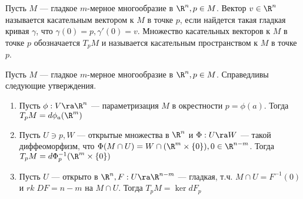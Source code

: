 \begin{definition}
    Пусть \(M\) --- гладкое \(m\)-мерное многообразие в \(\R^n, p \in M\). Вектор \(v \in \R^n\) называется касательным вектором к \(M\) в точке \(p\), если найдется такая гладкая кривая \(\gamma\), что \(\gamma(0) = p, \gamma'(0) = v\). Множество касательных векторов к \(M\) в точке \(p\) обозначается \(T_pM\) и называется касательным пространством к \(M\) в точке \(p\).
\end{definition}

\begin{theorem}
    Пусть \(M\) --- гладкое \(m\)-мерное многообразие в \( \R^n, p \in M\). Справедливы следующие утверждения.
    \begin{enumerate}
        \item Пусть \(\phi: V \ra \R^n\) --- параметризация \(M\) в окрестности \(p = \phi(a)\). Тогда \(T_pM = d\phi_a(\R^m)\)
        \item Пусть \(U \ni p, W\) --- открытые множества в \(\R^n\) и \(\Phi: U \ra W\) --- такой диффеоморфизм, что \(\Phi(M \cap U) = W \cap (\R^m \times \{0\}), 0 \in \R^{n - m}\). Тогда \(T_pM = d\Phi^{-1}_p(\R^m \times \{0\})\)
        \item Пусть \(U\) --- открыто в \(\R^n, F: U \ra \R^{n - m}\) --- гладкая, т.ч. \(M \cap U = F^{-1}(0)\) и \(rk\;DF = n - m\) на \(M \cap U\). Тогда \(T_pM = \ker dF_p\)
    \end{enumerate}
\end{theorem}
